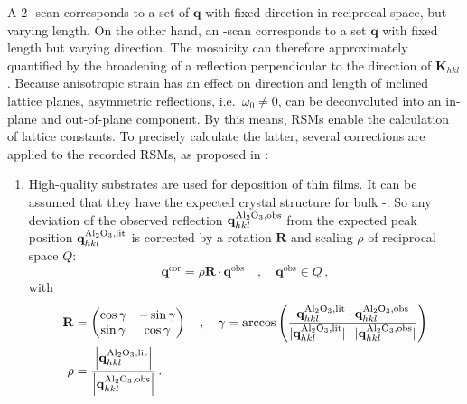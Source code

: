 A 2\texttheta-\textomega-scan corresponds to a set of $\mathbf{q}$ with fixed direction in reciprocal space, but varying length.
On the other hand, an \textomega-scan corresponds to a set $\mathbf{q}$ with fixed length but varying direction.
The mosaicity can therefore approximately quantified by the broadening of a reflection perpendicular to the direction of $\mathbf{K}_{hkl}$.
Because anisotropic strain has an effect on direction and length of inclined lattice planes, asymmetric reflections, i.e.\ $\omega_0\neq0$, can be deconvoluted into an in-plane and out-of-plane component.
By this means, \glspl{RSM} enable the calculation of lattice constants.
To precisely calculate the latter, several corrections are applied to the recorded \glspl{RSM}, as proposed in \textcite{kneiss2021}:
\begin{enumerate}
    \item High-quality substrates are used for deposition of thin films.
    It can be assumed that they have the expected crystal structure for bulk \textalpha-.
    So any deviation of the observed reflection $\mathbf{q}_{hkl}^\mathrm{\ce{Al2O3},obs}$ from the expected peak position $\mathbf{q}_{hkl}^\mathrm{\ce{Al2O3},lit}$ is corrected by a rotation $\mathbf{R}$ and scaling $\rho$ of reciprocal space $Q$:
    \begin{equation}
        \mathbf{q}^\mathrm{cor}=\rho\mathbf{R}\cdot\mathbf{q}^\mathrm{obs}\quad,\quad\mathbf{q}^\mathrm{obs}\in Q\,,
    \end{equation}
    with
    \begin{align}
        \label{Equ:Methods_rotation}
        \mathbf{R}&=\begin{pmatrix}
            \cos\gamma&-\sin\gamma\\
            \sin\gamma&\cos\gamma
        \end{pmatrix}\quad,\quad
        \gamma=\arccos\left(\frac{\mathbf{q}_{hkl}^\mathrm{\ce{Al2O3},lit}\cdot \mathbf{q}_{hkl}^\mathrm{\ce{Al2O3},obs}}{|\mathbf{q}_{hkl}^\mathrm{\ce{Al2O3},lit}|\cdot|\mathbf{q}_{hkl}^\mathrm{\ce{Al2O3},obs}|}\right)\\
        \rho&=\frac{\left|\mathbf{q}_{hkl}^\mathrm{\ce{Al2O3},lit}\right|}{\left|\mathbf{q}_{hkl}^\mathrm{\ce{Al2O3},obs}\right|}\,.
    \end{align}


\end{enumerate}
